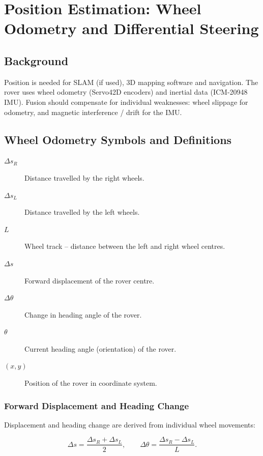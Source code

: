 \newpage
\section{Position Estimation: Wheel Odometry and Differential Steering}\label{sec:Position Estimation: Wheel Odometry and differential steering}

\subsection{Background}
Position is needed for SLAM (if used), 3D mapping software and navigation. The rover uses wheel odometry (Servo42D encoders) and inertial data (ICM-20948 IMU). 
Fusion should compensate for individual weaknesses: wheel slippage for odometry, and magnetic interference / drift for the IMU.

\subsection{Wheel Odometry Symbols and Definitions}\label{sec:Wheel Odometry Symbols and Definitions}

\begin{description}
    \item[\(\Delta s_R\)] Distance travelled by the right wheels.
    \item[\(\Delta s_L\)] Distance travelled by the left wheels.
    \item[\(L\)] Wheel track – distance between the left and right wheel centres.
    \item[\(\Delta s\)] Forward displacement of the rover centre.
    \item[\(\Delta\theta\)] Change in heading angle of the rover.
    \item[\(\theta\)] Current heading angle (orientation) of the rover.
    \item[\((x, y)\)] Position of the rover in coordinate system.
\end{description}

\subsubsection{Forward Displacement and Heading Change}
Displacement and heading change are derived from individual wheel movements:

\begin{equation}
\Delta s = \frac{\Delta s_R + \Delta s_L}{2}, \qquad
\Delta\theta = \frac{\Delta s_R - \Delta s_L}{L}.
\end{equation}
  
